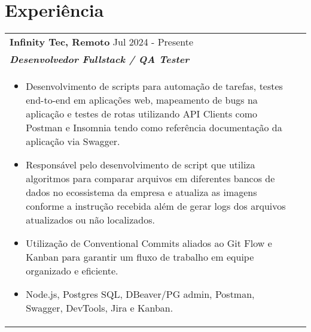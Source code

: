 \documentclass[a4paper,8pt]{article}
\begin{document}
\section{Experiência}
\begin{tabularx}{\linewidth}{ @{}l r@{} }
\color[HTML]{1C033C} \textbf{{Infinity Tec, Remoto}} \hfill \color[HTML]{371e77} Jul 2024 - Presente \\
\color[HTML]{371e77}\textbf{\textit{Desenvolvedor Fullstack / QA Tester}} \\[5pt]
\begin{minipage}[t]{\linewidth}
\begin{itemize}[nosep,after=\strut, leftmargin=2em, itemsep=2pt]
\item Desenvolvimento de scripts para automação de tarefas, testes end-to-end em aplicações web, mapeamento de bugs na aplicação e testes de rotas utilizando API Clients como Postman e Insomnia tendo como referência documentação da aplicação via Swagger.
\item Responsável pelo desenvolvimento de script que utiliza algoritmos para comparar arquivos em diferentes bancos de dados no ecossistema da empresa e atualiza as imagens conforme a instrução recebida além de gerar logs dos arquivos atualizados ou não localizados.
\item Utilização de Conventional Commits aliados ao Git Flow e Kanban para garantir um fluxo de trabalho em equipe organizado e eficiente.
\item Node.js, Postgres SQL, DBeaver/PG admin, Postman, Swagger, DevTools, Jira e Kanban.
\end{itemize}
\end{minipage}
\end{tabularx}
\end{document}
